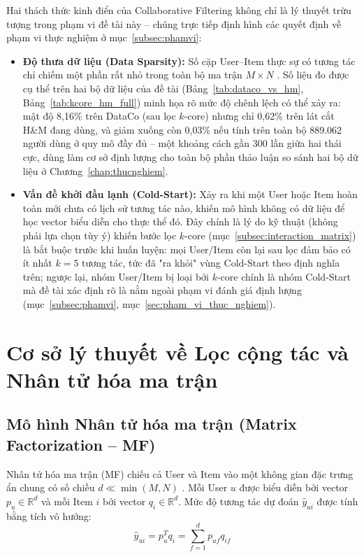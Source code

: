 Hai thách thức kinh điển của Collaborative Filtering không chỉ là lý thuyết trừu tượng trong phạm vi đề tài này -- chúng trực tiếp định hình các quyết định về phạm vi thực nghiệm ở mục~\ref{subsec:phamvi}:
\begin{itemize}
    \item \textbf{Độ thưa dữ liệu (Data Sparsity):} Số cặp User--Item thực sự có tương tác chỉ chiếm một phần rất nhỏ trong toàn bộ ma trận $M \times N$ \parencite{koren2009matrix}. Số liệu đo được cụ thể trên hai bộ dữ liệu của đề tài (Bảng~\ref{tab:dataco_vs_hm}, Bảng~\ref{tab:kcore_hm_full}) minh họa rõ mức độ chênh lệch có thể xảy ra: mật độ 8,16\% trên DataCo (sau lọc $k$-core) nhưng chỉ 0,62\% trên lát cắt H\&M đang dùng, và giảm xuống còn 0,03\% nếu tính trên toàn bộ 889.062 người dùng ở quy mô đầy đủ -- một khoảng cách gần 300 lần giữa hai thái cực, dùng làm cơ sở định lượng cho toàn bộ phần thảo luận so sánh hai bộ dữ liệu ở Chương~\ref{chap:thucnghiem}.
    \item \textbf{Vấn đề khởi đầu lạnh (Cold-Start):} Xảy ra khi một User hoặc Item hoàn toàn mới chưa có lịch sử tương tác nào, khiến mô hình không có dữ liệu để học vector biểu diễn cho thực thể đó. Đây chính là lý do kỹ thuật (không phải lựa chọn tùy ý) khiến bước lọc $k$-core (mục~\ref{subsec:interaction_matrix}) là bắt buộc trước khi huấn luyện: mọi User/Item còn lại sau lọc đảm bảo có ít nhất $k=5$ tương tác, tức đã "ra khỏi" vùng Cold-Start theo định nghĩa trên; ngược lại, nhóm User/Item bị loại bởi $k$-core chính là nhóm Cold-Start mà đề tài xác định rõ là nằm ngoài phạm vi đánh giá định lượng (mục~\ref{subsec:phamvi}, mục~\ref{sec:pham_vi_thuc_nghiem}).
\end{itemize}

\section{Cơ sở lý thuyết về Lọc cộng tác và Nhân tử hóa ma trận}
\label{sec:cf_mf}

\subsection{Mô hình Nhân tử hóa ma trận (Matrix Factorization -- MF)}
\label{subsec:mf_model}

Nhân tử hóa ma trận (MF) chiếu cả User và Item vào một không gian đặc trưng ẩn chung có số chiều $d \ll \min(M, N)$ \parencite{koren2009matrix}. Mỗi User $u$ được biểu diễn bởi vector $p_u \in \mathbb{R}^d$ và mỗi Item $i$ bởi vector $q_i \in \mathbb{R}^d$. Mức độ tương tác dự đoán $\hat{y}_{ui}$ được tính bằng tích vô hướng:
\begin{equation}
    \hat{y}_{ui} = p_u^T q_i = \sum_{f=1}^{d} p_{uf} q_{if}
    \label{eq:mf_dot}
\end{equation}

